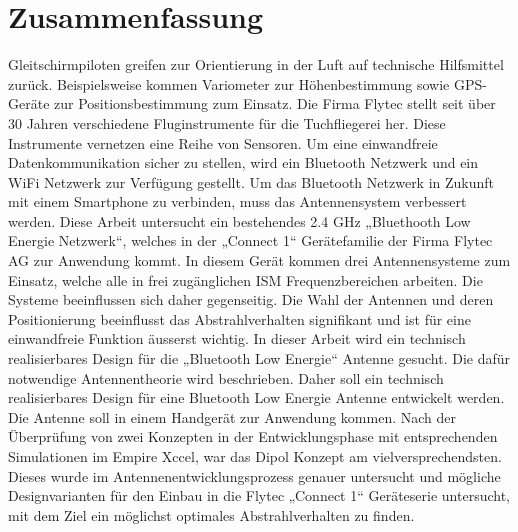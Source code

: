 \section*{Zusammenfassung}

Gleitschirmpiloten greifen zur Orientierung in der Luft auf technische Hilfsmittel zurück. Beispielsweise kommen Variometer zur Höhenbestimmung sowie GPS-Geräte zur Positionsbestimmung zum Einsatz. Die Firma Flytec stellt seit über 30 Jahren verschiedene Fluginstrumente für die Tuchfliegerei her. Diese Instrumente vernetzen eine Reihe von Sensoren. Um eine einwandfreie Datenkommunikation sicher zu stellen, wird ein Bluetooth Netzwerk und ein WiFi Netzwerk zur Verfügung gestellt. Um das Bluetooth Netzwerk in Zukunft mit einem Smartphone zu verbinden, muss das Antennensystem verbessert werden.
Diese Arbeit untersucht ein bestehendes 2.4 GHz „Bluethooth Low Energie Netzwerk“, welches in der „Connect 1“ Gerätefamilie der Firma Flytec AG zur Anwendung kommt. In diesem  Gerät kommen drei Antennensysteme zum Einsatz, welche alle in frei zugänglichen ISM Frequenzbereichen arbeiten. Die Systeme beeinflussen sich daher gegenseitig. Die Wahl der Antennen und deren Positionierung beeinflusst das Abstrahlverhalten signifikant und ist für eine einwandfreie Funktion äusserst wichtig. In dieser Arbeit wird ein technisch realisierbares Design für die „Bluetooth Low Energie“ Antenne gesucht. Die dafür notwendige Antennentheorie wird beschrieben. Daher soll ein technisch realisierbares Design für eine Bluetooth Low Energie Antenne entwickelt werden. Die Antenne soll in einem Handgerät zur Anwendung kommen. Nach der Überprüfung von zwei Konzepten in der Entwicklungsphase mit entsprechenden Simulationen im Empire Xccel, war das Dipol Konzept am vielversprechendsten. Dieses wurde im Antennenentwicklungsprozess genauer untersucht und mögliche Designvarianten für den Einbau in die Flytec „Connect 1“ Geräteserie untersucht, mit dem Ziel ein möglichst optimales Abstrahlverhalten zu finden.
